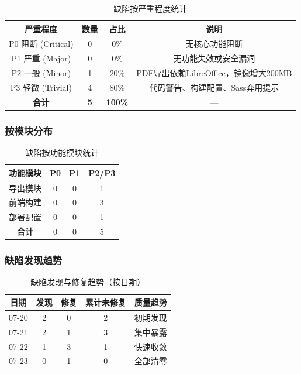 \begin{table}[htbp]
    \centering
    \caption{缺陷按严重程度统计}
    \begin{tabular}{|c|c|c|c|}
        \hline
        \textbf{严重程度} & \textbf{数量} & \textbf{占比} & \textbf{说明} \\
        \hline
        P0 阻断 (Critical) & 0 & 0\% & 无核心功能阻断 \\
        \hline
        P1 严重 (Major) & 0 & 0\% & 无功能失效或安全漏洞 \\
        \hline
        P2 一般 (Minor) & 1 & 20\% & PDF导出依赖LibreOffice，镜像增大200MB \\
        \hline
        P3 轻微 (Trivial) & 4 & 80\% & 代码警告、构建配置、Sass弃用提示 \\
        \hline
        \textbf{合计} & \textbf{5} & \textbf{100\%} & — \\
        \hline
    \end{tabular}
\end{table}

\subsubsection{按模块分布}

\begin{table}[htbp]
    \centering
    \caption{缺陷按功能模块统计}
    \begin{tabular}{|c|c|c|c|}
        \hline
        \textbf{功能模块} & \textbf{P0} & \textbf{P1} & \textbf{P2/P3} \\
        \hline
        导出模块 & 0 & 0 & 1 \\
        \hline
        前端构建 & 0 & 0 & 3 \\
        \hline
        部署配置 & 0 & 0 & 1 \\
        \hline
        \textbf{合计} & 0 & 0 & 5 \\
        \hline
    \end{tabular}
\end{table}

\subsubsection{缺陷发现趋势}

\begin{table}[htbp]
    \centering
    \caption{缺陷发现与修复趋势（按日期）}
    \begin{tabular}{|c|c|c|c|c|}
        \hline
        \textbf{日期} & \textbf{发现} & \textbf{修复} & \textbf{累计未修复} & \textbf{质量趋势} \\
        \hline
        07-20 & 2 & 0 & 2 & 初期发现 \\
        \hline
        07-21 & 2 & 1 & 3 & 集中暴露 \\
        \hline
        07-22 & 1 & 3 & 1 & 快速收敛 \\
        \hline
        07-23 & 0 & 1 & 0 & 全部清零 \\
        \hline
    \end{tabular}
\end{table}

